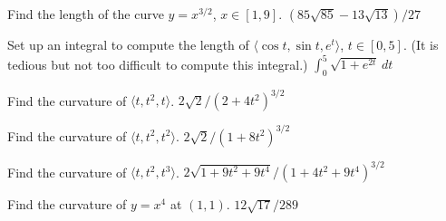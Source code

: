 \exercise Find the length of the curve $y=x^{3/2}$, $x\in[1,9]$.
\answer $(85\sqrt{85}-13\sqrt{13})/27$
\endanswer
\endexercise

\exercise Set up an integral to compute the length of
$\langle \cos t, \sin t, e^t\rangle$, $t\in[0,5]$. (It is tedious but
not too difficult to compute this integral.)
\answer $\int_0^5 \sqrt{1+e^{2t}}\,dt$
\endanswer
\endexercise

\exercise Find the curvature of $\langle t,t^2,t\rangle$.
\answer $2\sqrt2/(2+4t^2)^{3/2}$
\endanswer
\endexercise

\exercise Find the curvature of $\langle t,t^2,t^2\rangle$.
\answer $2\sqrt2/(1+8t^2)^{3/2}$
\endanswer
\endexercise

\exercise Find the curvature of $\langle t,t^2,t^3\rangle$.
\answer $2\sqrt{1+9t^2+9t^4}/(1+4t^2+9t^4)^{3/2}$
\endanswer
\endexercise

\exercise Find the curvature of $y=x^4$ at $(1,1)$.
\answer $12\sqrt{17}/289$
\endanswer
\endexercise

\endexercises

